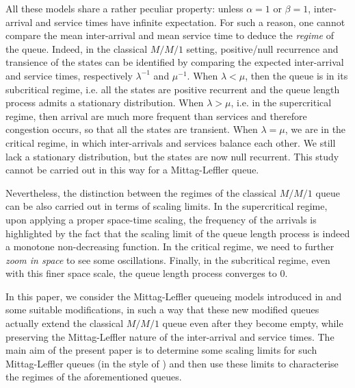 \documentclass[]{amsart}
\numberwithin{equation}{section}
\theoremstyle{remark}
\theoremstyle{definition}
\begin{document}
All these models share a rather peculiar property: unless $\alpha=1$ or $\beta=1$, inter-arrival and service times have infinite expectation. For such a reason, one cannot compare the mean inter-arrival and mean service time to deduce the \textit{regime} of the queue. Indeed, in the classical $M/M/1$ setting, positive/null recurrence and transience of the states can be identified by comparing the expected inter-arrival and service times, respectively $\lambda^{-1}$ and $\mu^{-1}$. When $\lambda<\mu$, then the queue is in its subcritical regime, i.e. all the states are positive recurrent and the queue length process admits a stationary distribution. When $\lambda>\mu$, i.e. in the supercritical regime, then arrival are much more frequent than services and therefore congestion occurs, so that all the states are transient. When $\lambda=\mu$, we are in the critical regime, in which inter-arrivals and services balance each other. We still lack a stationary distribution, but the states are now null recurrent. This study cannot be carried out in this way for a Mittag-Leffler queue. 

Nevertheless, the distinction between the regimes of the classical $M/M/1$ queue can be also carried out in terms of scaling limits. In the supercritical regime, upon applying a proper space-time scaling, the frequency of the arrivals is highlighted by the fact that the scaling limit of the queue length process is indeed a monotone non-decreasing function. In the critical regime, we need to further \textit{zoom in space} to see some oscillations. Finally, in the subcritical regime, even with this finer space scale, the queue length process converges to $0$.

In this paper, we consider the Mittag-Leffler queueing models introduced in \cite{butt2023queuing} and some suitable modifications, in such a way that these new modified queues actually extend the classical $M/M/1$ queue even after they become empty, while preserving the Mittag-Leffler nature of the inter-arrival and service times. The main aim of the present paper is to determine some scaling limits for such Mittag-Leffler queues (in the style of \cite[Theorem 3.3]{butt2023queuing}) and then use these limits to characterise the regimes of the aforementioned queues. 
\end{document}
